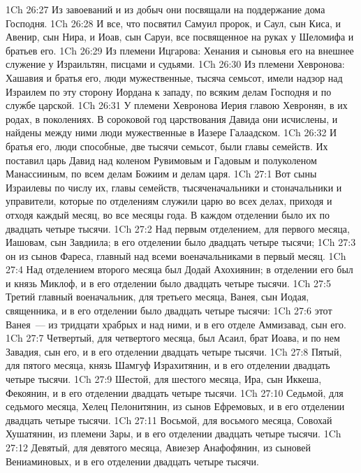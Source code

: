 \vs 1Ch 26:27 Из завоеваний и из добыч они посвящали на поддержание дома Господня.
\vs 1Ch 26:28 И все, что посвятил Самуил пророк, и Саул, сын Киса, и Авенир, сын Нира, и Иоав, сын Саруи, все посвященное  на руках у Шеломифа и братьев его.
\rsbpar\vs 1Ch 26:29 Из племени Ицгарова: Хенания и сыновья его  на внешнее служение у Израильтян, писцами и судьями.
\vs 1Ch 26:30 Из племени Хевронова: Хашавия и братья его, люди мужественные, тысяча семьсот, имели надзор над Израилем по эту сторону Иордана к западу, по всяким делам  Господня и по службе царской.
\vs 1Ch 26:31 У племени Хевронова Иерия  главою Хевронян, в их родах, в поколениях. В сороковой год царствования Давида они исчислены, и найдены между ними люди мужественные в Иазере Галаадском.
\vs 1Ch 26:32 И братья его, люди способные, две тысячи семьсот, были главы семейств. Их поставил царь Давид над коленом Рувимовым и Гадовым и полуколеном Манассииным, по всем делам Божиим и делам царя.
\vs 1Ch 27:1 Вот сыны Израилевы по числу их, главы семейств, тысяченачальники и стоначальники и управители, которые по отделениям служили царю во всех делах, приходя и отходя каждый месяц, во все месяцы года. В каждом отделении было их по двадцать четыре тысячи.
\vs 1Ch 27:2 Над первым отделением, для первого месяца,  Иашовам, сын Завдиила; в его отделении было двадцать четыре тысячи;
\vs 1Ch 27:3 он  из сынов Фареса, главный над всеми военачальниками в первый месяц.
\vs 1Ch 27:4 Над отделением второго месяца был Додай Ахохиянин; в отделении его был и князь Миклоф, и в его отделении было двадцать четыре тысячи.
\vs 1Ch 27:5 Третий главный военачальник, для третьего месяца, Ванея, сын Иодая, священника, и в его отделении было двадцать четыре тысячи:
\vs 1Ch 27:6 этот Ванея~---  из тридцати храбрых и  над ними, и в его отделе  Аммизавад, сын его.
\vs 1Ch 27:7 Четвертый, для четвертого месяца, был Асаил, брат Иоава, и по нем Завадия, сын его, и в его отделении двадцать четыре тысячи.
\vs 1Ch 27:8 Пятый, для пятого месяца, князь Шамгуф Израхитянин, и в его отделении двадцать четыре тысячи.
\vs 1Ch 27:9 Шестой, для шестого месяца, Ира, сын Иккеша, Фекоянин, и в его отделении двадцать четыре тысячи.
\vs 1Ch 27:10 Седьмой, для седьмого месяца, Хелец Пелонитянин, из сынов Ефремовых, и в его отделении двадцать четыре тысячи.
\vs 1Ch 27:11 Восьмой, для восьмого месяца, Совохай Хушатянин, из племени Зары, и в его отделении двадцать четыре тысячи.
\vs 1Ch 27:12 Девятый, для девятого месяца, Авиезер Анафофянин, из сыновей Вениаминовых, и в его отделении двадцать четыре тысячи.
